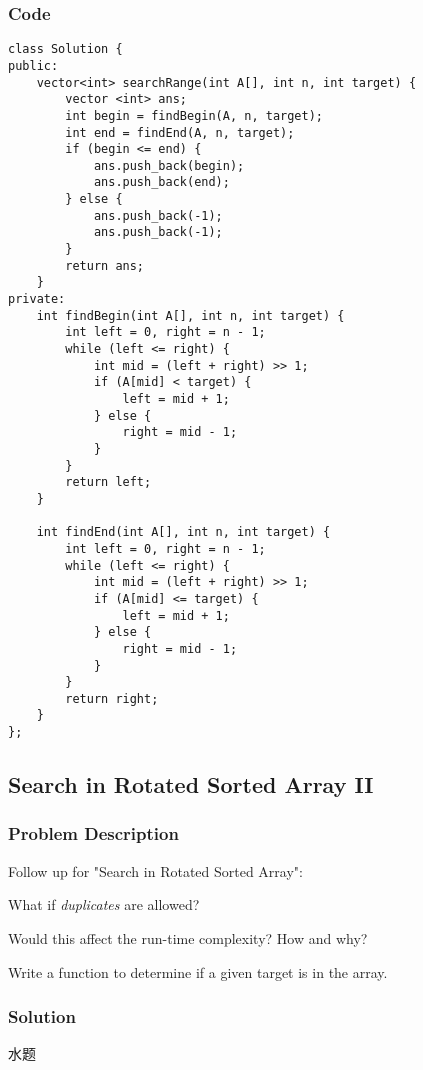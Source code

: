 \documentclass[courier]{article}
\begin{document}
\begin{CJK*}{UTF8}{gkai}
\subsubsection*{Code}
\begin{lstlisting}
class Solution {
public:
    vector<int> searchRange(int A[], int n, int target) {
        vector <int> ans;
        int begin = findBegin(A, n, target);
        int end = findEnd(A, n, target);
        if (begin <= end) {
            ans.push_back(begin);
            ans.push_back(end);
        } else {
            ans.push_back(-1);
            ans.push_back(-1);
        }
        return ans;
    }
private:
    int findBegin(int A[], int n, int target) {
        int left = 0, right = n - 1;
        while (left <= right) {
            int mid = (left + right) >> 1;
            if (A[mid] < target) {
                left = mid + 1;
            } else {
                right = mid - 1;
            }
        }
        return left;
    }
    
    int findEnd(int A[], int n, int target) {
        int left = 0, right = n - 1;
        while (left <= right) {
            int mid = (left + right) >> 1;
            if (A[mid] <= target) {
                left = mid + 1;
            } else {
                right = mid - 1;
            }
        }
        return right;
    }
}; 
\end{lstlisting}


\subsection{ Search in Rotated Sorted Array II }

\subsubsection*{Problem Description}
Follow up for "Search in Rotated Sorted Array":


What if \emph{duplicates} are allowed?

Would this affect the run-time complexity? How and why?

Write a function to determine if a given target is in the array.



\subsubsection*{Solution}
水题


\end{CJK*}
\end{document}
